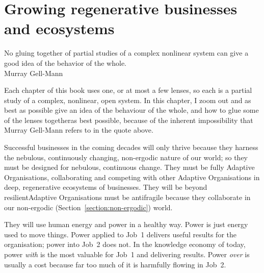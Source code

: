 ﻿%
\chapter{Growing regenerative businesses and ecosystems}
\label{chapter:growing-regenerative-organisations}




\begin{chapterquotation}
No gluing together of partial studies of a complex nonlinear system can give a good idea of the behavior of the whole. \\
\raggedleft\textemdash Murray Gell-Mann
\end{chapterquotation} 


Each chapter of this book uses one, or at most a few lenses, so each is a partial study of a complex, nonlinear, open system. In this chapter, I zoom out and as best as possible give an idea of the behaviour of the whole, and how to glue some of the lenses together\textemdash as best possible, because of the inherent impossibility that Murray Gell-Mann refers to in the quote above. 


Successful businesses in the coming decades will only thrive because they harness the nebulous, continuously changing, non-ergodic nature of our world; so they must be designed for nebulous, continuous change. They must be fully Adaptive Organisations, collaborating and competing with other Adaptive Organisations in deep, regenerative ecosystems of businesses. They will be beyond resilient\textemdash Adaptive Organisations must be antifragile\cite{taleb-antifragile} because they collaborate in our non-ergodic (Section~\ref{section:non-ergodic}) world.


They will use human energy and power in a healthy way. Power is just energy used to move things. Power applied to Job~1 delivers useful results for the organisation; power into Job~2 does not. In the knowledge economy of today, power \emph{with} is the most valuable for Job~1 and delivering results. Power \emph{over} is usually a cost because far too much of it is harmfully flowing in Job~2. 


